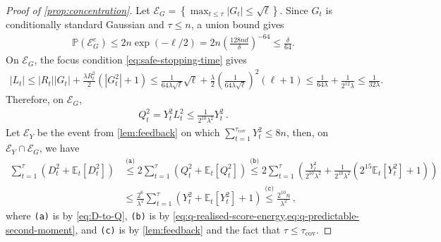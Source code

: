 \documentclass[11pt]{article}
\newcommand{\reason}[1]{\texttt{(#1)}}
\newcommand{\explan}[2]{\stackrel{\reason{#2}}{#1}}
\newcommand{\E}{\mathbb E}
\newcommand{\Pp}{\mathbb P}
\newcommand{\1}{\mathbf 1}
\begin{document}
\begin{proof}[Proof of \cref{prop:concentration}]
    Let $\mathcal E_G=\left\{\max_{t\leq\tau}|G_t|\leq \sqrt\ell\right\}$.
    Since $G_t$ is conditionally standard Gaussian and $\tau\leq n$, a union bound gives
    \begin{align}
        \Pp(\mathcal E_G^c)
        \leq 2n\exp(-\ell/2)
        =2n\left(\frac{128nd}{\delta}\right)^{-64}
        \leq \frac{\delta}{64}.
        \label{eq:q-gaussian-maximum}
    \end{align}
    On $\mathcal E_G$, the focus condition \eqref{eq:safe-stopping-time} gives
    \begin{align}
        |L_t| \leq |R_t||G_t| + \frac{\lambda R_t^2}{2}(|G_t^2| + 1)
        \leq
        \frac{1}{64\lambda\sqrt\ell}\sqrt\ell
        +
        \frac{\lambda}{2}
        \left(\frac{1}{64\lambda\sqrt\ell}\right)^2
        (\ell+1)
        \leq
        \frac{1}{64\lambda}
        +\frac{1}{2^{12}\lambda}
        \leq \frac{1}{32\lambda}.
        \label{eq:q-score-bound}
    \end{align}
    Therefore, on $\mathcal E_G$,
    \begin{align}
        Q_t^2
        =
        Y_t^2L_t^2
        \leq
        \frac{1}{2^{10}\lambda^2}
        Y_t^2\,.
        \label{eq:q-realised-score-energy}
    \end{align}
    Let $\mathcal E_Y$ be the event from \cref{lem:feedback} on which $\sum_{t=1}^{\tau_{\mathrm{cov}}}Y_t^2\leq 8n$, then, on
    $\mathcal E_Y\cap\mathcal E_G$, we have
    \begin{align}
        \sum_{t=1}^\tau
        \left(D_t^2+\E_t[D_t^2]\right)
         & \explan{\leq}{a}
        2
        \sum_{t=1}^\tau
        \left(
        Q_t^2 + \E_t[Q_t^2]
        \right)
        \explan{\leq}{b}
        2
        \sum_{t=1}^\tau
        \left(
        \frac{Y_t^2}{2^{10}\lambda^2}
        +
        \frac{1}{2^{10}\lambda^2}
        \left(
        2^{15}\E_t[Y_t^2]+1
        \right)
        \right)
        \\
         &
        \leq
        \frac{2^6}{\lambda^2}
        \sum_{t=1}^\tau
        \left(
        Y_t^2
        +
        \E_t[Y_t^2]+1
        \right)
        \explan{\leq}{c}
        \frac{2^{10}n}{\lambda^2}\,,
        \label{eq:q-total-self-normaliser}
    \end{align}
    where \reason{a} is by \eqref{eq:D-to-Q}, \reason{b} is by
    \cref{eq:q-realised-score-energy,eq:q-predictable-second-moment},
    and \reason{c} is by \cref{lem:feedback} and the fact that
    $\tau\leq\tau_{\mathrm{cov}}$.


\end{proof}
\end{document}
